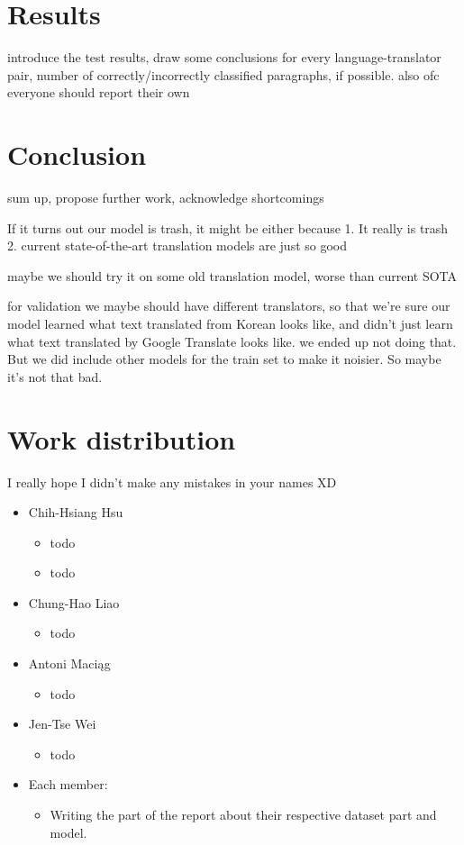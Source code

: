 \documentclass[twocolumn]{article}
\begin{document}
\section*{Results}

introduce the test results, draw some conclusions
for every language-translator pair, number of correctly/incorrectly classified paragraphs, if possible. also ofc everyone should report their own

\section*{Conclusion}

sum up, propose further work, acknowledge shortcomings

If it turns out our model is trash, it might be either because 1. It really is trash 2. current state-of-the-art translation models are just so good

maybe we should try it on some old translation model, worse than current SOTA

for validation we maybe should have different translators, so that we're sure our model learned what text translated from Korean looks like, and didn't just learn what text translated by Google Translate looks like.
we ended up not doing that. But we did include other models for the train set to make it noisier. So maybe it’s not that bad. 


\section*{Work distribution}

I really hope I didn't make any mistakes in your names XD

\begin{itemize}
	\item Chih-Hsiang Hsu
	\begin{itemize}
		\item todo
		\item todo
	\end{itemize}
	
	\item Chung-Hao Liao
	\begin{itemize}
		\item todo
	\end{itemize}
	
	\item Antoni Maciąg
	\begin{itemize}
		\item todo
	\end{itemize}
	
	\item Jen-Tse Wei
	\begin{itemize}
		\item todo
	\end{itemize}
	
	\item Each member:
	\begin{itemize}
		\item Writing the part of the report about their respective dataset part and model.
	\end{itemize}
\end{itemize}
\end{document}
